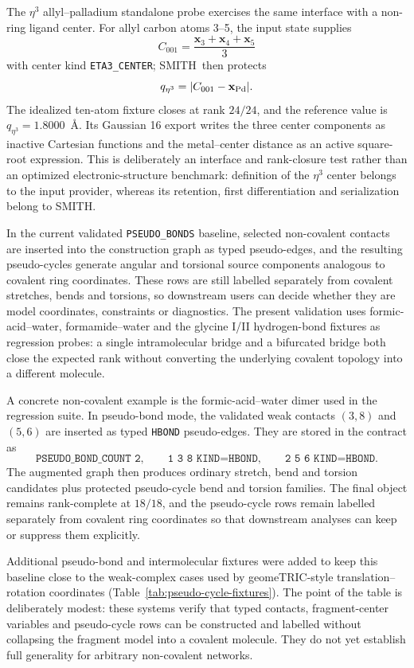 \documentclass[journal=jctcce,manuscript=article,layout=traditional]{achemso}
\newcommand{\SMITH}{\textsc{SMITH}}
\theoremstyle{definition}
\begin{document}
The $\eta^3$ allyl--palladium standalone probe exercises the same interface with a
non-ring ligand center.  For allyl carbon atoms 3--5, the input state supplies
\[
 C_{001}=\frac{\mathbf{x}_3+\mathbf{x}_4+\mathbf{x}_5}{3}
\]
with center kind \texttt{ETA3\_CENTER}; \SMITH\ then protects
\[
 q_{\eta^3}=|C_{001}-\mathbf{x}_{\rm Pd}|.
\]
The idealized ten-atom fixture closes at rank \(24/24\), and the reference
value is \(q_{\eta^3}=1.8000\)~\AA.  Its Gaussian 16 export writes the three
center components as inactive Cartesian functions and the metal--center
distance as an active square-root expression.  This is deliberately an
interface and rank-closure test rather than an optimized electronic-structure
benchmark: definition of the $\eta^3$ center belongs to the input provider,
whereas its retention, first differentiation and serialization belong to \SMITH.

In the current validated \texttt{PSEUDO\_BONDS} baseline, selected
non-covalent contacts are inserted into the construction graph as typed
pseudo-edges, and the resulting pseudo-cycles generate angular and torsional
source components analogous to covalent ring coordinates.  These rows are still
labelled separately from covalent stretches, bends and torsions, so downstream
users can decide whether they are model coordinates, constraints or
diagnostics.  The present validation uses formic-acid--water, formamide--water
and the glycine I/II hydrogen-bond fixtures as regression probes: a single
intramolecular bridge and a bifurcated bridge both close the expected rank
without converting the underlying covalent topology into a different molecule.

A concrete non-covalent example is the formic-acid--water dimer used in the
regression suite.  In pseudo-bond mode, the validated weak contacts
\((3,8)\) and \((5,6)\) are inserted as typed \texttt{HBOND} pseudo-edges.
They are stored in the contract as
\[
  \texttt{PSEUDO\_BOND\_COUNT 2}, \qquad
  \texttt{1 3 8 KIND=HBOND}, \qquad
  \texttt{2 5 6 KIND=HBOND}.
\]
The augmented graph then produces ordinary stretch, bend and torsion candidates
plus protected pseudo-cycle bend and torsion families.  The final object
remains rank-complete at \(18/18\), and the pseudo-cycle rows remain labelled
separately from covalent ring coordinates so that downstream analyses can keep
or suppress them explicitly.

Additional pseudo-bond and intermolecular fixtures were added to keep this
baseline close to the weak-complex cases used by geomeTRIC-style
translation--rotation coordinates (Table~\ref{tab:pseudo-cycle-fixtures}).
The point of the table is deliberately modest: these systems verify that typed
contacts, fragment-center variables and pseudo-cycle rows can be constructed
and labelled without collapsing the fragment model into a covalent molecule.
They do not yet establish full generality for arbitrary non-covalent networks.
\end{document}
